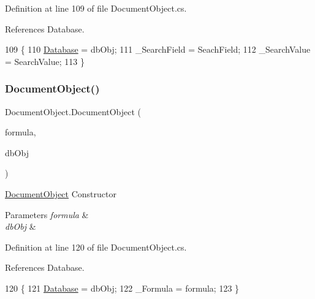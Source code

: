 Definition at line 109 of file Document\+Object.\+cs.



References Database.


\begin{DoxyCode}
109                                                                                        \{
110         \mbox{\hyperlink{class_document_object_a69d5338c9835f748490323d2950eed09}{Database}} = dbObj;
111         \_SearchField = SeachField;
112         \_SearchValue = SearchValue;
113     \}
\end{DoxyCode}
\mbox{\label{class_document_object_a4eb6c7aaa4774d1d5dbf5bf17dff23d9}} 
\subsubsection{\texorpdfstring{Document\+Object()}{DocumentObject()}\hspace{0.1cm}{\footnotesize\ttfamily [3/3]}}
{\footnotesize\ttfamily Document\+Object.\+Document\+Object (\begin{DoxyParamCaption}\item[{string}]{formula,  }\item[{\mbox{\hyperlink{class_database_object}{Database\+Object}}}]{db\+Obj }\end{DoxyParamCaption})}



\mbox{\hyperlink{class_document_object}{Document\+Object}} Constructor 


\begin{DoxyParams}{Parameters}
{\em formula} & \\
\hline
{\em db\+Obj} & \\
\hline
\end{DoxyParams}


Definition at line 120 of file Document\+Object.\+cs.



References Database.


\begin{DoxyCode}
120                                                                 \{
121         \mbox{\hyperlink{class_document_object_a69d5338c9835f748490323d2950eed09}{Database}} = dbObj;
122         \_Formula = formula;
123     \}
\end{DoxyCode}


